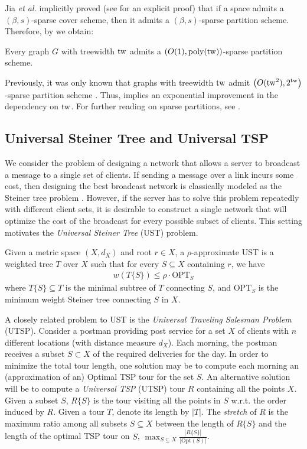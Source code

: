 \documentclass{article}
\newcommand{\tw}{{\rm tw}}
\newcommand{\poly}{\mathrm{poly}}
\newcommand{\etal}{{\em et al. \xspace}}
\newcommand{\UST}{\textsf{UST}\xspace}
\newcommand{\OPT}{\text{OPT}}
\newcommand{\UTSP}{\textsf{UTSP}\xspace}
\newcommand{\TSP}{\textsf{TSP}\xspace}
\begin{document}
Jia \etal \cite{JLNRS05} implicitly proved (see \cite{Fil20} for an explicit proof) that if a space admits a $(\beta,s)$-sparse cover scheme, then it admits a $(\beta,s)$-sparse partition scheme. Therefore, by  we obtain:

\begin{corollary}\label{cor:sparsePartition}
	Every graph $G$ with treewidth $\tw$ admits a $\left(O(1),\poly(\tw)\right)$-sparse partition scheme. 
\end{corollary}

Previously, it was only known that graphs with treewidth $\tw$ admit  $\left(O(\tw^2),2^{\tw}\right)$-sparse partition scheme \cite{FT03,Fil20}.  Thus,  implies an exponential improvement in the dependency on $\tw$.  For further reading on sparse partitions, see \cite{JLNRS05,BDRRS12,Fil20,CJFKVY23,Filtser24}.

\subsection{Universal Steiner Tree and Universal TSP}

We consider the problem of designing a network that allows a server to broadcast a message to a single set of clients. If sending a message over a link incurs some cost, then designing the best broadcast network is classically modeled as the Steiner tree problem \cite{HR92}. However, if the server has to solve this problem repeatedly with different client sets, it is desirable to construct a single network that will optimize the cost of the broadcast for every possible subset of clients. This setting motivates the \emph{Universal Steiner Tree} (\UST) problem.

Given a metric space $(X,d_X)$ and root  $r \in X$, a $\rho$-approximate \UST is a weighted tree $T$ over $X$ such that for every $S \subseteq X$ containing $r$, we have
\begin{align*}
	w(T\{S\}) \leq \rho \cdot \OPT_S
\end{align*}
where $T\{S\} \subseteq T$ is the minimal subtree of $T$ connecting $S$, and $\OPT_S$ is the minimum weight Steiner tree connecting $S$ in $X$.




A closely related problem to \UST is the \emph{Universal Traveling Salesman Problem} (\UTSP).
Consider a postman providing post service for a set $X$ of clients with $n$ different locations (with distance measure $d_X$). Each morning, the postman receives a subset $S\subset X$ of the required deliveries for the day. In order to minimize the total tour length, one solution may be to compute each morning an (approximation of an) Optimal \TSP tour for the set $S$. An alternative solution will be to compute a \emph{Universal \TSP} (\UTSP) tour $R$ containing all the points $X$. Given a subset $S$, $R\{S\}$ is the tour visiting all the points in $S$ w.r.t. the order induced by $R$.
Given a tour $T$, denote its length by $|T|$. The \emph{stretch} of $R$ is the maximum ratio among all subsets $S\subseteq X$ between the length of $R\{S\}$ and the length of the optimal \TSP tour on $S$, $\max_{S\subseteq X}\frac{|R\{S\}|}{|\mbox{Opt}(S)|}$.
\end{document}
